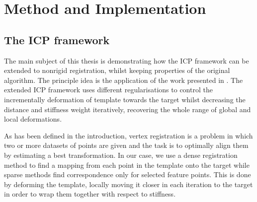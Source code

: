 \documentclass[../structure.tex]{subfiles}
\begin{document}
\chapter{Method and Implementation}
\section{The ICP framework}
\hspace{2em}The main subject of this thesis is demonstrating how the ICP framework can be extended to nonrigid registration, whilst keeping properties of the original algorithm. The principle idea is the application of the work presented in \cite{Amberg2007}. The extended ICP framework uses different regularisations to control the incrementally deformation of template towards the target whilst decreasing the distance and stiffness weight iteratively, recovering the whole range of global and local deformations.
\begin{comment}
To reach the goal of finding the optimal alignment of the objects (graphs), iterative closest point algorithm is used. It search for each point in the template the nearest point in target, and to find the optimal deformation for a given stiffness, optimal iterative closest point steps are used. Preliminary correspondences are estimated by a nearest point search. Subsequently, the optimal deformation of the template for these fixed correspondences and the active stiffness is calculated. Afterwards, the process continues with new correspondences found by searching from the displaced template vertices. We present an algorithm using a locally affine regularisation which assigns an affine transformation to each vertex and minimises the difference in the transformation of neighbouring vertices. It is shown that for this regularisation, the optimal deformation for fixed correspondences and fixed stiffness can be determined exactly and efficiently. The method is successful for a wide range of initial conditions. Furthermore, it is compared qualitatively and quantitatively to other algorithms using synthetic examples and real world data.
\end{comment}

\hspace{2em}As has been defined in the introduction, vertex registration is a problem in which two or more datasets of points are given and the task is to optimally align them by estimating a best transformation. In our case, we use a dense registration method to find a mapping from each point in the template onto the target while sparse methods find correspondence only for selected feature points. This is done by deforming the template, locally moving it closer in each iteration to the target in order to wrap them together with respect to stiffness.
\end{document}
